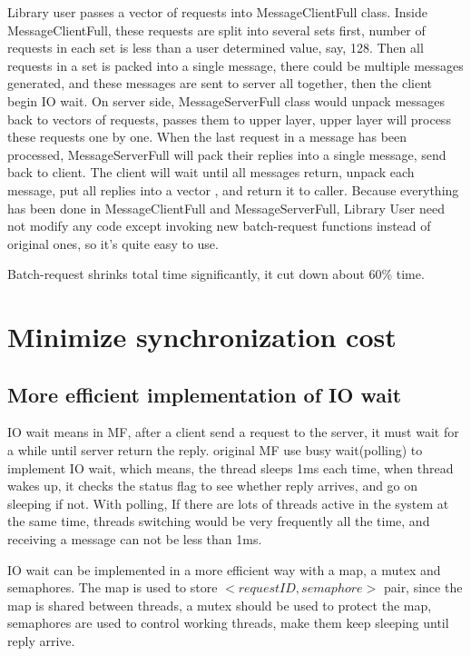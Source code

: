 \documentclass[a4paper,10pt]{article}
\begin{document}
Library user passes a vector of requests into MessageClientFull class. Inside MessageClientFull, these requests are split into several sets first, number of requests in each set is less than a user determined value, say, 128.
Then all requests in a set is packed into a single message, there could be multiple messages generated, and these messages are sent to server all together, then the client begin IO wait.
On server side, MessageServerFull class would unpack messages back to vectors of requests, passes them to upper layer, upper layer will process these requests one by one.
When the last request in a message has been processed, MessageServerFull will pack their replies into a single message, send back to client.
The client will wait until all messages return, unpack each message, put all replies into a vector , and return it to caller.
Because everything has been done in MessageClientFull and MessageServerFull, Library User need not modify any code except invoking new batch-request functions instead of original ones, so it's quite easy to use.

Batch-request shrinks total time significantly, it cut down about 60\% time.

\section{Minimize synchronization cost}

\subsection{More efficient implementation of IO wait}
IO wait means in MF, after a client send a request to the server, it must wait for a while until server return the reply.
original MF use busy wait(polling) to implement IO wait, which means, the thread sleeps 1ms each time, when thread wakes up, it checks the status flag to see whether reply arrives, and go on sleeping if not.
With polling, If there are lots of threads active in the system at the same time, threads switching would be very frequently all the time, and receiving a message can not be less than 1ms.

IO wait can be implemented in a more efficient way with a map, a mutex and semaphores.
The map is used to store $<request ID, semaphore>$ pair,
since the map is shared between threads, a mutex should be used to protect the map, semaphores are used to control working threads, make them keep sleeping until reply arrive.
\end{document}
